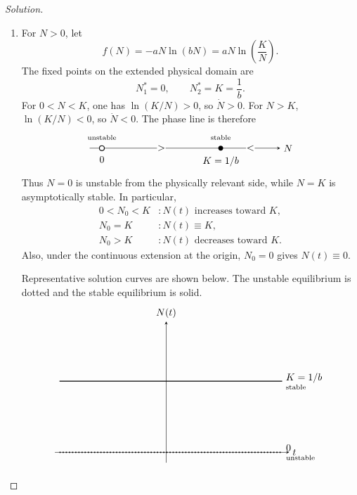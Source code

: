 \documentclass[10pt]{amsart}
\newenvironment{solution}
{\begin{proof}[Solution]}
{\end{proof}}
\begin{document}
\begin{onehalfspace}
\begin{solution}
\begin{enumerate}[label=\alph*)]
                \item For $N>0$, let
                \[
                    f(N)=-aN\ln(bN)=aN\ln\left(\frac{K}{N}\right).
                \]
                The fixed points on the extended physical domain are
                \[
                    \boxed{N^*_1=0,
                        \qquad
                        N^*_2=K=\frac1b.}
                \]
                For $0<N<K$, one has $\ln(K/N)>0$, so $\dot N>0$. For $N>K$,
                $\ln(K/N)<0$, so $\dot N<0$. The phase line is therefore
                \[
                    \begin{tikzpicture}[baseline=-0.5ex,>=stealth,x=1.25cm]
                  \draw[->] (-0.35,0)--(5.1,0) node[right] {$N$};
                  \draw[fill=white,thick] (0,0) circle (2.5pt);
                  \fill (3.4,0) circle (2.5pt);
                  \node[below=5pt] at (0,0) {$0$};
                  \node[below=5pt] at (3.4,0) {$K=1/b$};
                  \node[above=5pt] at (0,0) {\scriptsize unstable};
                  \node[above=5pt] at (3.4,0) {\scriptsize stable};
                  \node[fill=white,inner sep=0.5pt] at (1.7,0) {$>$};
                  \node[fill=white,inner sep=0.5pt] at (4.25,0) {$<$};
                    \end{tikzpicture}
                \]
                Thus $N=0$ is unstable from the physically relevant side, while $N=K$ is
                asymptotically stable. In particular,
                \[
                    \boxed{
                        \begin{array}{ll}
                            0<N_0<K &: N(t)\text{ increases toward }K,\\
                            N_0=K &: N(t)\equiv K,\\
                            N_0>K &: N(t)\text{ decreases toward }K.
                        \end{array}}
                \]
                Also, under the continuous extension at the origin, $N_0=0$ gives
                $N(t)\equiv0$.

                Representative solution curves are shown below. The unstable equilibrium
                is dotted and the stable equilibrium is solid.
                \[
                    \begin{tikzpicture}[>=stealth,x=0.83cm,y=0.82cm]
                  \draw[->] (-4.8,0)--(5.3,0) node[right] {$t$};
                  \draw[->] (0,-0.45)--(0,5.7) node[above] {$N(t)$};

                  \draw[very thick,dotted] (-4.6,0)--(5.0,0)
                  node[right,align=left] {$0$\\[-1mm]{\scriptsize unstable}};
                  \draw[thick] (-4.6,3.1)--(5.0,3.1)
                  node[right,align=left] {$K=1/b$\\[-1mm]{\scriptsize stable}};


\end{tikzpicture}\]
\end{enumerate}
\end{solution}
\end{onehalfspace}
\end{document}
